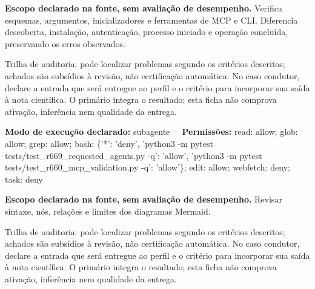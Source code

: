 
\begin{descricao}
\textbf{Escopo declarado na fonte, sem avaliação de desempenho.}
Verifica esquemas, argumentos, inicializadores e ferramentas de MCP e CLI. Diferencia descoberta, instalação, autenticação, processo iniciado e operação concluída, preservando os erros observados.
\end{descricao}

\begin{funcao}
Trilha de auditoria: pode localizar problemas segundo os critérios descritos; achados são subsídios à revisão, não certificação automática. No caso condutor, declare a entrada que será entregue ao perfil e o critério para incorporar sua saída à nota científica. O primário integra o resultado; esta ficha não comprova ativação, inferência nem qualidade da entrega.
\end{funcao}

\begin{arquitetura}
\textbf{Modo de execução declarado:} subagente · \textbf{Permissões:} read: allow; glob: allow; grep: allow; bash: \{'*': 'deny', 'python3 -m pytest tests/test\_r669\_requested\_agents.py -q': 'allow', 'python3 -m pytest tests/test\_r660\_mcp\_validation.py -q': 'allow'\}; edit: allow; webfetch: deny; task: deny
\end{arquitetura}


\begin{descricao}
\textbf{Escopo declarado na fonte, sem avaliação de desempenho.}
Revisar sintaxe, nós, relações e limites dos diagramas Mermaid.
\end{descricao}

\begin{funcao}
Trilha de auditoria: pode localizar problemas segundo os critérios descritos; achados são subsídios à revisão, não certificação automática. No caso condutor, declare a entrada que será entregue ao perfil e o critério para incorporar sua saída à nota científica. O primário integra o resultado; esta ficha não comprova ativação, inferência nem qualidade da entrega.
\end{funcao}

